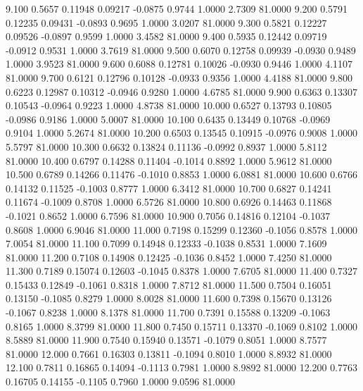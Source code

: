    9.100   0.5657   0.11948   0.09217  -0.0875   0.9744   1.0000   2.7309  81.0000
   9.200   0.5791   0.12235   0.09431  -0.0893   0.9695   1.0000   3.0207  81.0000
   9.300   0.5821   0.12227   0.09526  -0.0897   0.9599   1.0000   3.4582  81.0000
   9.400   0.5935   0.12442   0.09719  -0.0912   0.9531   1.0000   3.7619  81.0000
   9.500   0.6070   0.12758   0.09939  -0.0930   0.9489   1.0000   3.9523  81.0000
   9.600   0.6088   0.12781   0.10026  -0.0930   0.9446   1.0000   4.1107  81.0000
   9.700   0.6121   0.12796   0.10128  -0.0933   0.9356   1.0000   4.4188  81.0000
   9.800   0.6223   0.12987   0.10312  -0.0946   0.9280   1.0000   4.6785  81.0000
   9.900   0.6363   0.13307   0.10543  -0.0964   0.9223   1.0000   4.8738  81.0000
  10.000   0.6527   0.13793   0.10805  -0.0986   0.9186   1.0000   5.0007  81.0000
  10.100   0.6435   0.13449   0.10768  -0.0969   0.9104   1.0000   5.2674  81.0000
  10.200   0.6503   0.13545   0.10915  -0.0976   0.9008   1.0000   5.5797  81.0000
  10.300   0.6632   0.13824   0.11136  -0.0992   0.8937   1.0000   5.8112  81.0000
  10.400   0.6797   0.14288   0.11404  -0.1014   0.8892   1.0000   5.9612  81.0000
  10.500   0.6789   0.14266   0.11476  -0.1010   0.8853   1.0000   6.0881  81.0000
  10.600   0.6766   0.14132   0.11525  -0.1003   0.8777   1.0000   6.3412  81.0000
  10.700   0.6827   0.14241   0.11674  -0.1009   0.8708   1.0000   6.5726  81.0000
  10.800   0.6926   0.14463   0.11868  -0.1021   0.8652   1.0000   6.7596  81.0000
  10.900   0.7056   0.14816   0.12104  -0.1037   0.8608   1.0000   6.9046  81.0000
  11.000   0.7198   0.15299   0.12360  -0.1056   0.8578   1.0000   7.0054  81.0000
  11.100   0.7099   0.14948   0.12333  -0.1038   0.8531   1.0000   7.1609  81.0000
  11.200   0.7108   0.14908   0.12425  -0.1036   0.8452   1.0000   7.4250  81.0000
  11.300   0.7189   0.15074   0.12603  -0.1045   0.8378   1.0000   7.6705  81.0000
  11.400   0.7327   0.15433   0.12849  -0.1061   0.8318   1.0000   7.8712  81.0000
  11.500   0.7504   0.16051   0.13150  -0.1085   0.8279   1.0000   8.0028  81.0000
  11.600   0.7398   0.15670   0.13126  -0.1067   0.8238   1.0000   8.1378  81.0000
  11.700   0.7391   0.15588   0.13209  -0.1063   0.8165   1.0000   8.3799  81.0000
  11.800   0.7450   0.15711   0.13370  -0.1069   0.8102   1.0000   8.5889  81.0000
  11.900   0.7540   0.15940   0.13571  -0.1079   0.8051   1.0000   8.7577  81.0000
  12.000   0.7661   0.16303   0.13811  -0.1094   0.8010   1.0000   8.8932  81.0000
  12.100   0.7811   0.16865   0.14094  -0.1113   0.7981   1.0000   8.9892  81.0000
  12.200   0.7763   0.16705   0.14155  -0.1105   0.7960   1.0000   9.0596  81.0000
